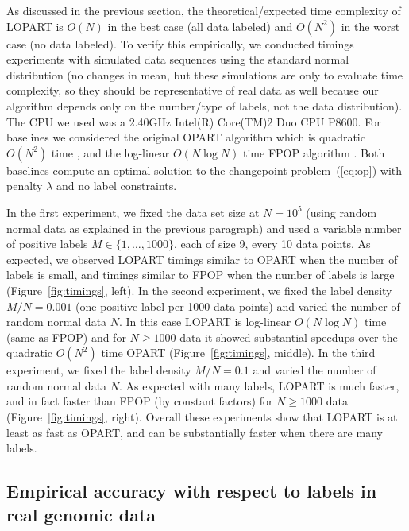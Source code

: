 \documentclass[12pt]{article}
\begin{document}
As discussed in the previous section, the theoretical/expected time complexity of LOPART is $O(N)$ in the best case (all data labeled) and $O(N^2)$ in the worst case (no data labeled).
To verify this empirically, we conducted timings experiments with simulated data sequences using the standard normal distribution (no changes in mean, but these simulations are only to evaluate time complexity, so they should be representative of real data as well because our algorithm depends only on the number/type of labels, not the data distribution). 
The CPU we used was a 2.40GHz Intel(R) Core(TM)2 Duo CPU P8600.
For baselines we considered the original OPART algorithm which is quadratic $O(N^2)$ time \citep{Jackson2005}, 
and the log-linear $O(N\log N)$ time FPOP algorithm \citep{Maidstone2016}. 
Both baselines compute an optimal solution to the changepoint problem~(\ref{eq:op}) with penalty $\lambda$ and no label constraints. 

In the first experiment, we fixed the data set size at $N=10^5$ (using random normal data as explained in the previous paragraph) and used a variable number of positive labels $M\in\{1, \dots, 1000\}$, each of size 9, every 10 data points. As expected, we observed LOPART timings similar to OPART when the number of labels is small, and timings similar to FPOP when the number of labels is large  (Figure~\ref{fig:timings}, left).
In the second experiment, we fixed the label density $M/N=0.001$ (one positive label per 1000 data points) and varied the number of random normal data $N$. 
In this case LOPART is log-linear $O(N\log N)$ time (same as FPOP) and for $N\geq 1000$ data it showed substantial speedups over the quadratic $O(N^2)$ time OPART (Figure~\ref{fig:timings}, middle).
In the third experiment, we fixed the label density $M/N=0.1$ and varied the number of random normal data $N$. 
As expected with many labels, LOPART is much faster, and in fact faster than FPOP (by constant factors) for $N\geq 1000$ data (Figure~\ref{fig:timings}, right).
Overall these experiments show that LOPART is at least as fast as OPART, and can be substantially faster when there are many labels.

\subsection{Empirical accuracy with respect to labels in real genomic data}
\label{sec:accuracy}
\end{document}
